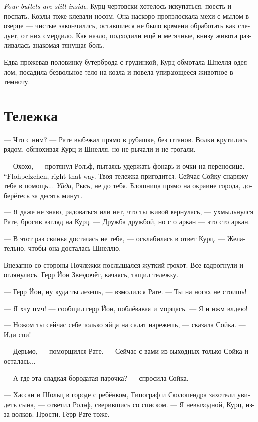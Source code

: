 \documentclass[a4paper,12pt,fleqn]{book}\usepackage{cooltooltips}\usepackage{polyglossia}\setdefaultlanguage[babelshorthands=true]{russian}\setotherlanguage{english}\defaultfontfeatures{Ligatures=TeX,Mapping=tex-text} \usepackage{xcolor}\definecolor{lightgray}{HTML}{bbbbbb}\color{lightgray}\newcommand{\ml}[3]{\textenglish{\textcolor{black}{#3}}}
\begin{document}
\ml{$0$}
{<<Четыре пули всё ещё там>>.}
{\textit{Four bullets are still inside.}}
Курц чертовски хотелось искупаться, поесть и поспать.
Козлы тоже клевали носом.
Она наскоро прополоскала мехи с мылом в озерце --- чистые закончились, оставшиеся не было времени обработать как следует, от них смердило.
Как назло, подходили ещё и месячные, внизу живота разливалась знакомая тянущая боль.

Едва прожевав половинку бутерброда с грудинкой, Курц обмотала Шнелля одеялом, посадила безвольное тело на козла и повела упирающееся животное в темноту.

\section{Тележка}

--- Что с ним? --- Рате выбежал прямо в рубашке, без штанов.
Волки крутились рядом, обнюхивая Курц и Шнелля, но не рычали и не трогали.

--- Охохо, --- протянул Рольф, пытаясь удержать фонарь и очки на переносице.
\ml{$0$}
{--- Флопельцхен, прямой дорогой.}
{``Flohpelzchen, right that way.}
Твоя тележка пригодится.
Сейчас Сойку снаряжу тебе в помощь...
\textit{Уйди}, Рысь, не до тебя.
Блошница прямо на окраине города, доберётесь за десять минут.

--- Я даже не знаю, радоваться или нет, что ты живой вернулась, --- ухмыльнулся Рате, бросив взгляд на Курц.
--- Дружба дружбой, но сто аркан --- это сто аркан.

--- В этот раз свинья досталась не тебе, --- осклабилась в ответ Курц.
--- Желательно, чтобы она досталась Шнеллю.

Внезапно со стороны Ночлежки послышался жуткий грохот.
Все вздрогнули и оглянулись.
Герр Йон Звездочёт, качаясь, тащил тележку.

--- Герр Йон, ну куда ты лезешь, --- взмолился Рате.
--- Ты на ногах не стоишь!

--- Я хчу пмч! --- сообщил герр Йон, поблёвавая и морщась.
--- Я и нжм влдею!

--- Ножом ты сейчас себе только яйца на салат нарежешь, --- сказала Сойка.
--- Иди спи!

--- Дерьмо, --- поморщился Рате.
--- Сейчас с вами из выходных только Сойка и осталась...

--- А где эта сладкая бородатая парочка? --- спросила Сойка.

--- Хассан и Шольц в городе с ребёнком, Типограф и Сколопендра захотели увидеть сына, --- ответил Рольф, сверившись со списком.
--- Я невыходной, Курц, из-за волков.
Прости.
Герр Рате тоже.
\end{document}
